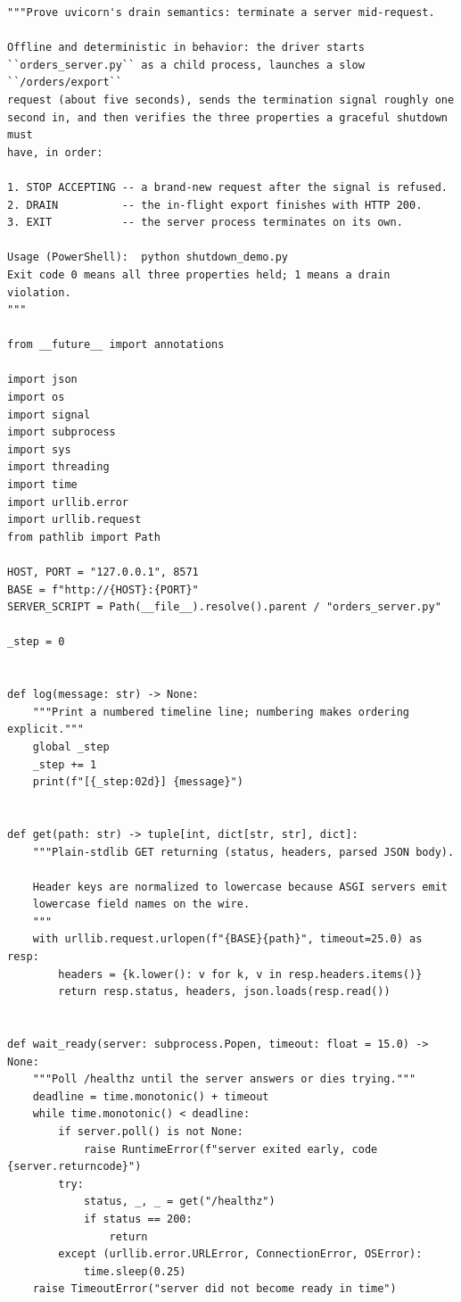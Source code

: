 \begin{verbatim}
"""Prove uvicorn's drain semantics: terminate a server mid-request.

Offline and deterministic in behavior: the driver starts
``orders_server.py`` as a child process, launches a slow ``/orders/export``
request (about five seconds), sends the termination signal roughly one
second in, and then verifies the three properties a graceful shutdown must
have, in order:

1. STOP ACCEPTING -- a brand-new request after the signal is refused.
2. DRAIN          -- the in-flight export finishes with HTTP 200.
3. EXIT           -- the server process terminates on its own.

Usage (PowerShell):  python shutdown_demo.py
Exit code 0 means all three properties held; 1 means a drain violation.
"""

from __future__ import annotations

import json
import os
import signal
import subprocess
import sys
import threading
import time
import urllib.error
import urllib.request
from pathlib import Path

HOST, PORT = "127.0.0.1", 8571
BASE = f"http://{HOST}:{PORT}"
SERVER_SCRIPT = Path(__file__).resolve().parent / "orders_server.py"

_step = 0


def log(message: str) -> None:
    """Print a numbered timeline line; numbering makes ordering explicit."""
    global _step
    _step += 1
    print(f"[{_step:02d}] {message}")


def get(path: str) -> tuple[int, dict[str, str], dict]:
    """Plain-stdlib GET returning (status, headers, parsed JSON body).

    Header keys are normalized to lowercase because ASGI servers emit
    lowercase field names on the wire.
    """
    with urllib.request.urlopen(f"{BASE}{path}", timeout=25.0) as resp:
        headers = {k.lower(): v for k, v in resp.headers.items()}
        return resp.status, headers, json.loads(resp.read())


def wait_ready(server: subprocess.Popen, timeout: float = 15.0) -> None:
    """Poll /healthz until the server answers or dies trying."""
    deadline = time.monotonic() + timeout
    while time.monotonic() < deadline:
        if server.poll() is not None:
            raise RuntimeError(f"server exited early, code {server.returncode}")
        try:
            status, _, _ = get("/healthz")
            if status == 200:
                return
        except (urllib.error.URLError, ConnectionError, OSError):
            time.sleep(0.25)
    raise TimeoutError("server did not become ready in time")



\end{verbatim}
